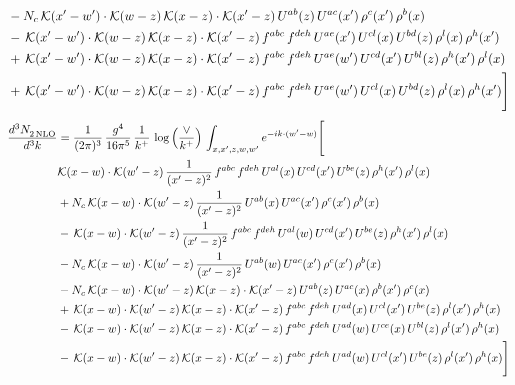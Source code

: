 \documentclass[9pt]{article}
\numberwithin{equation}{section}
\begin{document}
\begin{align}
&-N_{c}\,\mathcal{K}(x'-w')\cdot\mathcal{K}(w-z)\,\mathcal{K}(x-z)\cdot\mathcal{K}(x'-z)\,U^{ab}(z)\,U^{ac}(x')\,\rho^{c}(x')\,\rho^{b}(x)\notag\\
&-\,\mathcal{K}(x'-w')\cdot\mathcal{K}(w-z)\,\mathcal{K}(x-z)\cdot\mathcal{K}(x'-z)\,f^{abc}\,f^{deh}\,U^{ae}(x')\,U^{cl}(x)\,U^{bd}(z)\,\rho^{l}(x)\,\rho^{h}(x')\notag\\
&+\,\mathcal{K}(x'-w')\cdot\mathcal{K}(w-z)\,\mathcal{K}(x-z)\cdot\mathcal{K}(x'-z)\,f^{abc}\,f^{deh}\,U^{ae}(w')\,U^{cd}(x')\,U^{bl}(z)\,\rho^{h}(x')\,\rho^{l}(x)\notag\\
&+\,\mathcal{K}(x'-w')\cdot\mathcal{K}(w-z)\,\mathcal{K}(x-z)\cdot\mathcal{K}(x'-z)\,f^{abc}\,f^{deh}\,U^{ae}(w')\,U^{cl}(x)\,U^{bd}(z)\,\rho^{l}(x)\,\rho^{h}(x')\Bigg]
\end{align}
\begin{align}
\frac{d^{3}N_{2\,\rm NLO}^{\rm}}{d^{3}k}  & = \frac{1}{(2\pi)^{3}}\,\frac{g^{4}}{16\pi^{5}}\,\frac{1}{k^{+}}\,\log{\left(\frac{\vee}{k^{+}}\right)}\, \int_{x,x',z,w,w'}e^{-ik\cdot(w'-w)}\Bigg[\notag\\ & \mathcal{K}(x-w)\cdot\mathcal{K}(w'-z)\,\frac{1}{(x'-z)^{2}}\,f^{abc}\,f^{deh}\,U^{al}(x)\,U^{cd}(x')\,U^{be}(z)\,\rho^{h}(x')\,\rho^{l}(x)\notag\\
&+N_{c}\,\mathcal{K}(x-w)\cdot\mathcal{K}(w'-z)\,\frac{1}{(x'-z)^{2}}\,U^{ab}(x)\,U^{ac}(x')\,\rho^{c}(x')\,\rho^{b}(x)\notag\\
&-\,\mathcal{K}(x-w)\cdot\mathcal{K}(w'-z)\,\frac{1}{(x'-z)^{2}}\,f^{abc}\,f^{deh}\,U^{al}(w)\,U^{cd}(x')\,U^{be}(z)\,\rho^{h}(x')\,\rho^{l}(x)\notag\\
&-N_{c}\,\mathcal{K}(x-w)\cdot\mathcal{K}(w'-z)\,\frac{1}{(x'-z)^{2}}\,U^{ab}(w)\,U^{ac}(x')\,\rho^{c}(x')\,\rho^{b}(x)\notag\\
&-N_{c}\,\mathcal{K}(x-w)\cdot\mathcal{K}(w'-z)\,\mathcal{K}(x-z)\cdot\mathcal{K}(x'-z)\,U^{ab}(z)\,U^{ac}(x)\,\rho^{b}(x')\,\rho^{c}(x)\notag\\
&+\,\mathcal{K}(x-w)\cdot\mathcal{K}(w'-z)\,\mathcal{K}(x-z)\cdot\mathcal{K}(x'-z)\,f^{abc}\,f^{deh}\,U^{ad}(x)\,U^{cl}(x')\,U^{be}(z)\,\rho^{l}(x')\,\rho^{h}(x)\notag\\
&-\,\mathcal{K}(x-w)\cdot\mathcal{K}(w'-z)\,\mathcal{K}(x-z)\cdot\mathcal{K}(x'-z)\,f^{abc}\,f^{deh}\,U^{ad}(w)\,U^{ce}(x)\,U^{bl}(z)\,\rho^{l}(x')\,\rho^{h}(x)\notag\\
&-\,\mathcal{K}(x-w)\cdot\mathcal{K}(w'-z)\,\mathcal{K}(x-z)\cdot\mathcal{K}(x'-z)\,f^{abc}\,f^{deh}\,U^{ad}(w)\,U^{cl}(x')\,U^{be}(z)\,\rho^{l}(x')\,\rho^{h}(x)\Bigg]
\end{align}
\end{document}
